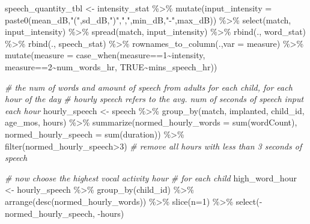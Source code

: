 \documentclass[
]{article}
\newenvironment{Shaded}{\begin{snugshade}}{\end{snugshade}}
\newcommand{\AttributeTok}[1]{\textcolor[rgb]{0.77,0.63,0.00}{#1}}
\newcommand{\CommentTok}[1]{\textcolor[rgb]{0.56,0.35,0.01}{\textit{#1}}}
\newcommand{\ConstantTok}[1]{\textcolor[rgb]{0.00,0.00,0.00}{#1}}
\newcommand{\DecValTok}[1]{\textcolor[rgb]{0.00,0.00,0.81}{#1}}
\newcommand{\FunctionTok}[1]{\textcolor[rgb]{0.00,0.00,0.00}{#1}}
\newcommand{\NormalTok}[1]{#1}
\newcommand{\OtherTok}[1]{\textcolor[rgb]{0.56,0.35,0.01}{#1}}
\newcommand{\SpecialCharTok}[1]{\textcolor[rgb]{0.00,0.00,0.00}{#1}}
\newcommand{\StringTok}[1]{\textcolor[rgb]{0.31,0.60,0.02}{#1}}
\begin{document}
\begin{Shaded}
\begin{Highlighting}[]
\NormalTok{speech\_quantity\_tbl }\OtherTok{\textless{}{-}}\NormalTok{ intensity\_stat }\SpecialCharTok{\%\textgreater{}\%}
  \FunctionTok{mutate}\NormalTok{(}\AttributeTok{input\_intensity =} \FunctionTok{paste0}\NormalTok{(mean\_dB,}\StringTok{"("}\NormalTok{,sd\_dB,}\StringTok{")"}\NormalTok{,}\StringTok{","}\NormalTok{,min\_dB,}\StringTok{"{-}"}\NormalTok{,max\_dB)) }\SpecialCharTok{\%\textgreater{}\%}
  \FunctionTok{select}\NormalTok{(match, input\_intensity) }\SpecialCharTok{\%\textgreater{}\%}
  \FunctionTok{spread}\NormalTok{(match, input\_intensity) }\SpecialCharTok{\%\textgreater{}\%}
  \FunctionTok{rbind}\NormalTok{(., word\_stat) }\SpecialCharTok{\%\textgreater{}\%}
  \FunctionTok{rbind}\NormalTok{(., speech\_stat) }\SpecialCharTok{\%\textgreater{}\%}
  \FunctionTok{rownames\_to\_column}\NormalTok{(.,}\AttributeTok{var =} \StringTok{\textquotesingle{}measure\textquotesingle{}}\NormalTok{) }\SpecialCharTok{\%\textgreater{}\%}
  \FunctionTok{mutate}\NormalTok{(}\AttributeTok{measure =} \FunctionTok{case\_when}\NormalTok{(measure}\SpecialCharTok{==}\StringTok{\textquotesingle{}1\textquotesingle{}}\SpecialCharTok{\textasciitilde{}}\StringTok{\textquotesingle{}intensity\textquotesingle{}}\NormalTok{,}
\NormalTok{            measure}\SpecialCharTok{==}\StringTok{\textquotesingle{}2\textquotesingle{}}\SpecialCharTok{\textasciitilde{}}\StringTok{\textquotesingle{}num\_words\_hr\textquotesingle{}}\NormalTok{,}
            \ConstantTok{TRUE}\SpecialCharTok{\textasciitilde{}}\StringTok{\textquotesingle{}mins\_speech\_hr\textquotesingle{}}\NormalTok{))}

  
\CommentTok{\# the num of words and amount of speech from adults for each child, for each hour of the day}
\CommentTok{\# hourly speech refers to the avg. num of seconds of speech input each hour}
\NormalTok{hourly\_speech }\OtherTok{\textless{}{-}}\NormalTok{ speech }\SpecialCharTok{\%\textgreater{}\%}
  \FunctionTok{group\_by}\NormalTok{(match, implanted, child\_id, age\_mos, hours) }\SpecialCharTok{\%\textgreater{}\%} 
  \FunctionTok{summarize}\NormalTok{(}\AttributeTok{normed\_hourly\_words =} \FunctionTok{sum}\NormalTok{(wordCount),}
            \AttributeTok{normed\_hourly\_speech =} \FunctionTok{sum}\NormalTok{(duration)) }\SpecialCharTok{\%\textgreater{}\%}
  \FunctionTok{filter}\NormalTok{(normed\_hourly\_speech}\SpecialCharTok{\textgreater{}}\DecValTok{3}\NormalTok{) }\CommentTok{\# remove all hours with less than 3 seconds of speech}

\CommentTok{\# now choose the highest vocal activity hour}
\CommentTok{\# for each child}
\NormalTok{high\_word\_hour }\OtherTok{\textless{}{-}}\NormalTok{ hourly\_speech }\SpecialCharTok{\%\textgreater{}\%}
  \FunctionTok{group\_by}\NormalTok{(child\_id) }\SpecialCharTok{\%\textgreater{}\%}
  \FunctionTok{arrange}\NormalTok{(}\FunctionTok{desc}\NormalTok{(normed\_hourly\_words)) }\SpecialCharTok{\%\textgreater{}\%}
  \FunctionTok{slice}\NormalTok{(}\AttributeTok{n=}\DecValTok{1}\NormalTok{) }\SpecialCharTok{\%\textgreater{}\%}
  \FunctionTok{select}\NormalTok{(}\SpecialCharTok{{-}}\NormalTok{normed\_hourly\_speech, }\SpecialCharTok{{-}}\NormalTok{hours)}


\end{Highlighting}
\end{Shaded}
\end{document}
